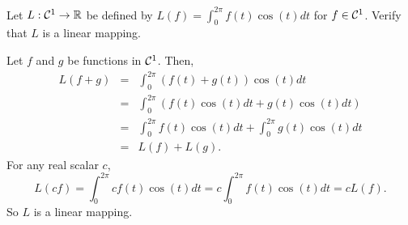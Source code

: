 \documentclass{ximera}
\begin{document}
\begin{exercise} \label{c7.2.5}
Let $L:{\cal C}^1\to\mbox{$\Bbb{R}$}$ be defined by $L(f) = \int_0^{2\pi}f(t)\cos(t)dt$
for $f\in{\cal C}^1$.  Verify that $L$ is a linear mapping.

\begin{solution}

Let $f$ and $g$ be functions in ${\cal C}^1$.  Then,
\[ \begin{array}{rcl}
 L(f + g) & = & \int_0^{2\pi}(f(t) + g(t))\cos(t)dt \\
& = & \int_0^{2\pi}(f(t)\cos(t)dt + g(t)\cos(t)dt) \\
& = & \int_0^{2\pi}f(t)\cos(t)dt + \int_0^{2\pi}g(t)\cos(t)dt \\
& = & L(f) + L(g). \end{array} \]
For any real scalar $c$,
\[ L(cf) = \int_0^{2\pi}cf(t)\cos(t)dt = c\int_0^{2\pi}f(t)\cos(t)dt
= cL(f). \]
So $L$ is a linear mapping.

\end{solution}
\end{exercise}
\end{document}

